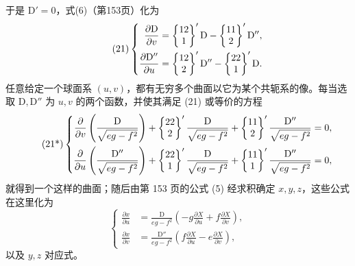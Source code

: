 于是 \(\mathrm D'=0\)，式(6)（第153页）化为
\begin{equation}\tag{21}
\left\{
\begin{aligned}
\frac{\partial\mathrm D}{\partial v}&=\left\{\begin{matrix}12\\1\end{matrix}\right\}'\mathrm D-\left\{\begin{matrix}11\\2\end{matrix}\right\}'\mathrm D'',\\
\frac{\partial\mathrm D''}{\partial u}&=\left\{\begin{matrix}12\\2\end{matrix}\right\}'\mathrm D''-\left\{\begin{matrix}22\\1\end{matrix}\right\}'\mathrm D.
\end{aligned}\right.
\end{equation}
任意给定一个球面系 \((u,v)\)，都有无穷多个曲面以它为某个共轭系的像。每当选取 \(\mathrm D,\mathrm D''\) 为 \(u,v\) 的两个函数，并使其满足 (21) 或等价的方程
\begin{equation}\tag{21*}
\left\{
\begin{aligned}
\frac{\partial}{\partial v}\left(\frac{\mathrm D}{\sqrt{eg-f^2}}\right)+\left\{\begin{matrix}22\\2\end{matrix}\right\}'\frac{\mathrm D}{\sqrt{eg-f^2}}+\left\{\begin{matrix}11\\2\end{matrix}\right\}'\frac{\mathrm D''}{\sqrt{eg-f^2}}&=0,\\
\frac{\partial}{\partial u}\left(\frac{\mathrm D''}{\sqrt{eg-f^2}}\right)+\left\{\begin{matrix}22\\1\end{matrix}\right\}'\frac{\mathrm D}{\sqrt{eg-f^2}}+\left\{\begin{matrix}11\\1\end{matrix}\right\}'\frac{\mathrm D''}{\sqrt{eg-f^2}}&=0,
\end{aligned}\right.
\end{equation}
就得到一个这样的曲面；随后由第 153 页的公式 (5) 经求积确定 \(x,y,z\)，这些公式在这里化为
\begin{equation}\tag{22}
\left\{
\begin{aligned}
\frac{\partial x}{\partial u}&=\frac{\mathrm D}{eg-f^2}\left(-g\frac{\partial X}{\partial u}+f\frac{\partial X}{\partial v}\right),\\
\frac{\partial x}{\partial v}&=\frac{\mathrm D''}{eg-f^2}\left(f\frac{\partial X}{\partial u}-e\frac{\partial X}{\partial v}\right),
\end{aligned}\right.
\end{equation}
以及 \(y,z\) 对应式。

